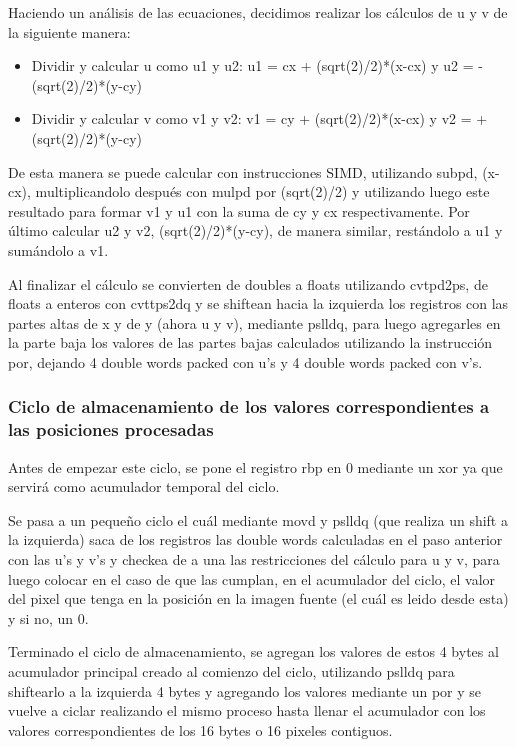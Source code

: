 Haciendo un análisis de las ecuaciones, decidimos realizar los cálculos de u y v de la siguiente manera:
\begin{itemize}
\item Dividir y calcular u como u1 y u2: u1 = cx + (sqrt(2)/2)*(x-cx) y u2 = -(sqrt(2)/2)*(y-cy)
\item Dividir y calcular v como v1 y v2: v1 = cy + (sqrt(2)/2)*(x-cx) y v2 = +(sqrt(2)/2)*(y-cy)
\end{itemize}

De esta manera se puede calcular con instrucciones SIMD, utilizando subpd, (x-cx), multiplicandolo después con mulpd por (sqrt(2)/2) y utilizando luego este resultado para formar v1 y u1 con la suma de cy y cx respectivamente. Por último calcular u2 y v2, (sqrt(2)/2)*(y-cy), de manera similar, restándolo a u1 y sumándolo a v1.

Al finalizar el cálculo se convierten de doubles a floats utilizando cvtpd2ps, de floats a enteros con cvttps2dq y se shiftean hacia la izquierda los registros con las partes altas de x y de y (ahora u y v), mediante pslldq, para luego agregarles en la parte baja los valores de las partes bajas calculados utilizando la instrucción por, dejando 4 double words packed con u's y 4 double words packed con v's.

\subsubsection{Ciclo de almacenamiento de los valores correspondientes a las posiciones procesadas}
Antes de empezar este ciclo, se pone el registro rbp en 0 mediante un xor ya que servirá como acumulador temporal del ciclo.

Se pasa a un pequeño ciclo el cuál mediante movd y pslldq (que realiza un shift a la izquierda) saca de los registros las double words calculadas en el paso anterior con las u's y v's y checkea de a una las restricciones del cálculo para u y v, para luego colocar en el caso de que las cumplan, en el acumulador del ciclo, el valor del pixel que tenga en la posición en la imagen fuente (el cuál es leido desde esta) y si no, un 0.

Terminado el ciclo de almacenamiento, se agregan los valores de estos 4 bytes al acumulador principal creado al comienzo del ciclo, utilizando pslldq para shiftearlo a la izquierda 4 bytes y agregando los valores mediante un por y se vuelve a ciclar realizando el mismo proceso hasta llenar el acumulador con los valores correspondientes de los 16 bytes o 16 pixeles contiguos.

